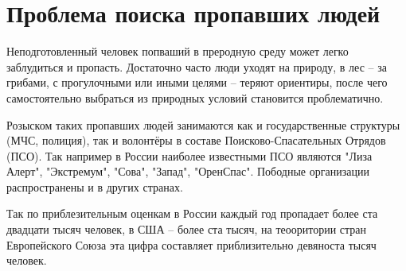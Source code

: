 \section{Проблема поиска пропавших людей}

Неподготовленный человек попваший в преродную среду может легко заблудиться и пропасть. Достаточно часто люди уходят на природу, в лес -- за грибами, с прогулочными или иными целями -- теряют ориентиры, после чего самостоятельно выбраться из природных условий становится проблематично.

Розыском таких пропавших людей занимаются как и государственные структуры (МЧС, полиция), так и волонтёры в составе Поисково-Спасательных Отрядов (ПСО). Так например в России наиболее известными ПСО являются "Лиза Алерт", "Экстремум", "Сова", "Запад", "ОренСпас". Пободные организации распространены и в других странах.

Так по приблезительным оценкам в России каждый год пропадает более ста двадцати тысяч человек, в США -- более ста тысяч, на теооритории стран Европейского Союза эта цифра составляет приблизительно девяноста тысяч человек.





\clearpage